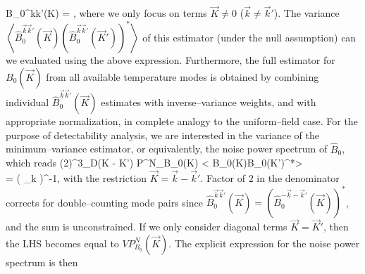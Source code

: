 \beq
\widehat B_0^{\vec k\vec k'}(\vec K) = ,
\label{eq:Bkkp_estimator}
\eeq
where we only focus on terms $\vec K\ne0$ ($\vec k \ne\vec k'$).
The variance $\left< \widehat B_0^{\vec k\vec k'}(\vec K)\left(\widehat B_0^{\vec k\vec k'}(\vec K')\right)^*\right>$ of this estimator (under the null assumption) can we evaluated using the above expression.
Furthermore, the full estimator for $B_0(\vec K)$ from all available temperature modes is obtained by combining individual $\widehat B_0^{\vec k\vec k'}(\vec K)$ estimates with inverse--variance weights, and with appropriate normalization, in complete analogy to the uniform--field case. For the purpose of detectability analysis, we are interested in the variance of the minimum--variance estimator, or equivalently, the noise power spectrum of $\widehat B_0$, which reads
\beq
\bga
(2\pi)^3\delta_D(\vec K - \vec K') P^N_{B_0}(\vec K) \equiv \left< \widehat B_0(\vec K)\widehat B_0(\vec K')^*\right>\\
= \left( \sum_{\vec k}  \right)^{-1},
\ega
\label{eq:NK1}
\eeq
with the restriction $\vec K=\vec k-\vec k'$. Factor of $2$ in the denominator corrects for double--counting mode pairs since $\widehat B_0^{\vec k\vec k'}(\vec K)=\left(\widehat B_0^{-\vec k-\vec k'}(\vec K)\right)^*$, and the sum is unconstrained. If we only consider diagonal terms $\vec K=\vec K'$, then the LHS becomes equal to $V P^N_{B_0}(\vec K)$. The explicit expression for the noise power spectrum is then
